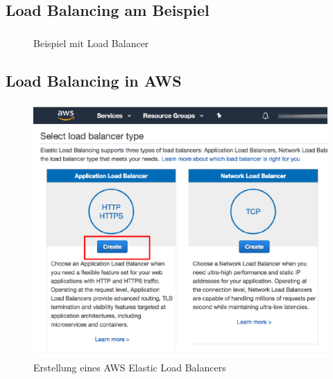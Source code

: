 \subsection{Load Balancing am Beispiel}
\begin{frame}
    \frametitle{\insertsection}
    \framesubtitle{\insertsubsection}

    \vspace*{-22pt}
    \begin{figure}[h]
        \centering
		\resizebox{!}{.75\textheight}{%
			
		}
		\captionsetup{aboveskip=2pt}
        \caption{Beispiel mit Load Balancer}
    \end{figure}
\end{frame}

\subsection{Load Balancing in AWS}
\begin{frame}
    \frametitle{\insertsection}
    \framesubtitle{\insertsubsection}

	\vspace{-12pt} %
    \begin{figure}[h]
        \centering
        \includegraphics[height=0.65\textheight]{../images/aws-elb-creation}
        \caption{Erstellung eines AWS Elastic Load Balancers~\cite{bitnamiConfigureElastic}}
    \end{figure}
\end{frame}


